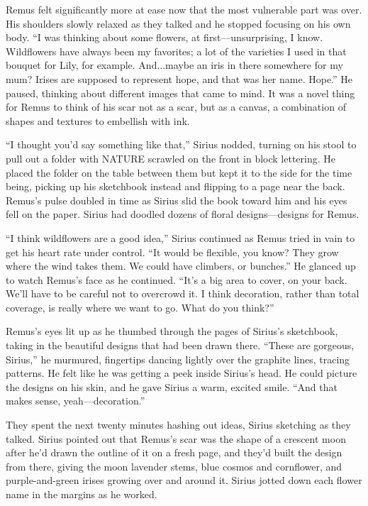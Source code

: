 Remus felt significantly more at ease now that the most vulnerable part was over. His shoulders slowly relaxed as they talked and he stopped focusing on his own body. “I was thinking about some flowers, at first—unsurprising, I know. Wildflowers have always been my favorites; a lot of the varieties I used in that bouquet for Lily, for example. And...maybe an iris in there somewhere for my mum? Irises are supposed to represent hope, and that was her name. Hope.” He paused, thinking about different images that came to mind. It was a novel thing for Remus to think of his scar not as a scar, but as a canvas, a combination of shapes and textures to embellish with ink.

“I thought you’d say something like that,” Sirius nodded, turning on his stool to pull out a folder with NATURE scrawled on the front in block lettering. He placed the folder on the table between them but kept it to the side for the time being, picking up his sketchbook instead and flipping to a page near the back. Remus’s pulse doubled in time as Sirius slid the book toward him and his eyes fell on the paper. Sirius had doodled dozens of floral designs—designs for Remus.

“I think wildflowers are a good idea,” Sirius continued as Remus tried in vain to get his heart rate under control. “It would be flexible, you know? They grow where the wind takes them. We could have climbers, or bunches.” He glanced up to watch Remus’s face as he continued. “It’s a big area to cover, on your back. We’ll have to be careful not to overcrowd it. I think decoration, rather than total coverage, is really where we want to go. What do you think?”

Remus’s eyes lit up as he thumbed through the pages of Sirius’s sketchbook, taking in the beautiful designs that had been drawn there. “These are gorgeous, Sirius,” he murmured, fingertips dancing lightly over the graphite lines, tracing patterns. He felt like he was getting a peek inside Sirius’s head. He could picture the designs on his skin, and he gave Sirius a warm, excited smile. “And that makes sense, yeah—decoration.”

They spent the next twenty minutes hashing out ideas, Sirius sketching as they talked. Sirius pointed out that Remus’s scar was the shape of a crescent moon after he’d drawn the outline of it on a fresh page, and they’d built the design from there, giving the moon lavender stems, blue cosmos and cornflower, and purple-and-green irises growing over and around it. Sirius jotted down each flower name in the margins as he worked.

